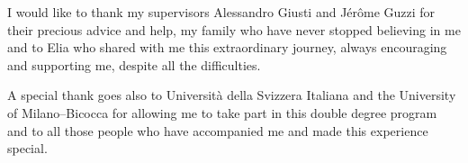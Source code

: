 I would like to thank my supervisors Alessandro Giusti and Jérôme Guzzi for their 
precious advice and help, my family who have never stopped believing in me and 
to Elia who shared with me this extraordinary journey, always encouraging and 
supporting me, despite all the difficulties.

A special thank goes also to Università della Svizzera Italiana and the University of 
Milano–Bicocca for allowing me to take part in this double degree program and 
to all those people who have accompanied me and made this experience special. 
